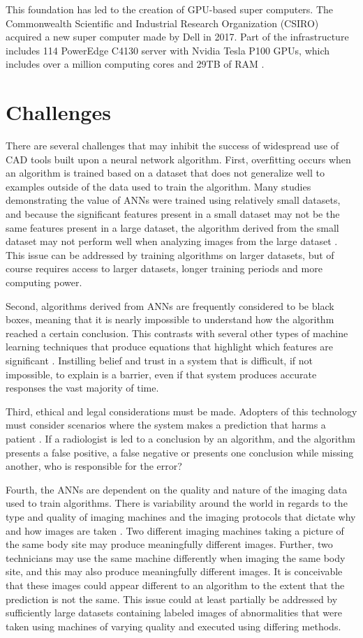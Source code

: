 \documentclass[sigconf]{acmart}
\begin{document}
This foundation has led to the creation of GPU-based super computers. The Commonwealth Scientific and Industrial Research Organization (CSIRO) acquired a new super computer made by Dell in 2017. Part of the infrastructure includes 114 PowerEdge C4130 server with Nvidia Tesla P100 GPUs, which includes over a million computing cores and 29TB of RAM \cite{cite15}.


\section{Challenges}

There are several challenges that may inhibit the success of widespread use of CAD tools built upon a neural network algorithm. First, overfitting occurs when an algorithm is trained based on a dataset that does not generalize well to examples outside of the data used to train the algorithm. Many studies demonstrating the value of ANNs were trained using relatively small datasets, and because the significant features present in a small dataset may not be the  same features present in a large dataset, the algorithm derived from the small dataset may not perform well when analyzing images from the large dataset \cite{cite08}\cite{cite05}. This issue can be addressed by training algorithms on larger datasets, but of course requires access to larger datasets, longer training periods and more computing power.

Second, algorithms derived from ANNs are frequently considered to be black boxes, meaning that it is nearly impossible to understand how the algorithm reached a certain conclusion. This contrasts with several other types of machine learning techniques that produce equations that highlight which features are significant \cite{cite05}. Instilling belief and trust in a system that is difficult, if not impossible, to explain is a barrier, even if that system produces accurate responses the vast majority of time.

Third, ethical and legal considerations must be made. Adopters of this technology must consider scenarios where the system makes a prediction that harms a patient \cite{cite05}. If a radiologist is led to a conclusion by an algorithm, and the algorithm presents a false positive, a false negative or presents one conclusion while missing another, who is responsible for the error?

Fourth, the ANNs are dependent on the quality and nature of the imaging data used to train algorithms. There is variability around the world in regards to the type and quality of imaging machines and the imaging protocols that dictate why and how images are taken \cite{cite05}. Two different imaging machines taking a picture of the same body site may produce meaningfully different images. Further, two technicians may use the same machine differently when imaging the same body site, and this may also produce meaningfully different images. It is conceivable that these images could appear different to an algorithm to the extent that the prediction is not the same. This issue could at least partially be addressed by sufficiently large datasets containing labeled images of abnormalities that were taken using machines of varying quality and executed using differing methods.
\end{document}
